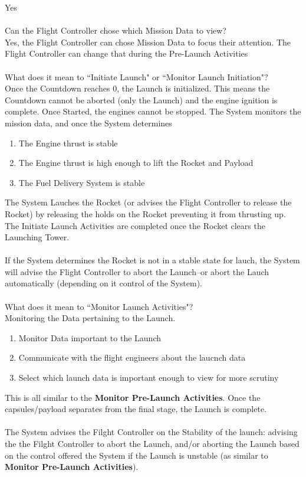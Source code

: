 \documentclass[letterpaper]{article}
\begin{document}
Yes\\\\
Can the Flight Controller chose which Mission Data to view?\\
Yes, the Flight Controller can chose Mission Data to focus their
attention.  The Flight Controller can change that during the Pre-Launch
Activities\\\\
What does it mean to ``Initiate Launch" or ``Monitor Launch
Initiation"?\\
Once the Countdown reaches 0, the Launch is initialized.  This means
the Countdown cannot be aborted (only the Launch) and the engine
ignition is complete.  Once Started, the engines cannot be stopped.
The System monitors the mission data, and once the System determines
\begin{enumerate}
\item The Engine thrust is stable
\item The Engine thrust is high enough to lift the Rocket and Payload
\item The Fuel Delivery System is stable
\end{enumerate}
The System Lauches the Rocket (or advises the Flight Controller to
release the Rocket) by releasing the holds on the Rocket preventing it
from thrusting up.  The Initiate Launch Activities are completed once
the Rocket clears the Launching Tower.\\\\
If the System determines the Rocket is not in
a stable state for lauch, the System will advise the Flight Controller
to abort the Launch--or abort the Lauch automatically (depending
on it control of the System).\\\\
What does it mean to ``Monitor Launch Activities"?\\
Monitoring the Data pertaining to the Launch.  
\begin{enumerate}
\item Monitor Data important to the Launch
\item Communicate with the flight engineers about the laucnch data
\item Select which launch data is important enough to view for more
scrutiny
\end{enumerate}
This is all similar to the \textbf{Monitor Pre-Launch Activities}.
Once the capsules/payload
separates from the final stage, the Launch is complete.\\\\
The System advises the Filght Controller on the Stability of the
launch:  advising the the Filght Controller to abort the Launch, and/or
aborting the Launch based on the control offered the System
if the Launch is unstable (as similar to \textbf{Monitor Pre-Launch
Activities}).
\end{document}
